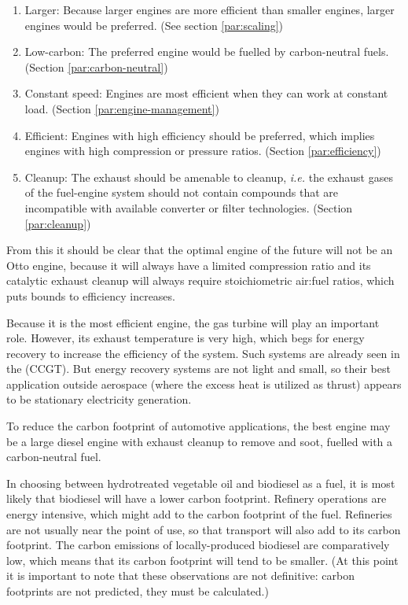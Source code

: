 \begin{enumerate}
  
  \item Larger: Because larger engines are more efficient than smaller engines,
  larger engines would be preferred. (See section \ref{par:scaling})
  
  \item Low-carbon: The preferred engine would be fuelled by carbon-neutral
  fuels. (Section \ref{par:carbon-neutral})
  
  \item Constant speed: Engines are most efficient when they can work at
  constant load. (Section \ref{par:engine-management})
  
  \item Efficient: Engines with high efficiency should be preferred, which
  implies engines with high compression or pressure ratios. (Section
  \ref{par:efficiency})
  
  \item Cleanup: The exhaust should be amenable to cleanup, \textit{i.e.} the
  exhaust gases of the fuel-engine system should not contain compounds that are
  incompatible with available converter or filter technologies. (Section
  \ref{par:cleanup})
     
\end{enumerate} 

From this it should be clear that the optimal engine of the future will not be
an Otto engine, because it will always have a limited compression ratio and its
catalytic exhaust cleanup will always require stoichiometric air:fuel ratios,
which puts bounds to efficiency increases.

Because it is the most efficient engine, the gas turbine will play an important
role. However, its exhaust temperature is very high, which begs for energy
recovery to increase the efficiency of the system. Such systems are already seen
in the  (CCGT). But energy recovery systems
are not light and small, so their best application outside aerospace (where the
excess heat is utilized as thrust) appears to be stationary electricity
generation.

To reduce the carbon footprint of automotive applications, the best engine may
be a large diesel engine with exhaust cleanup to remove \nox and soot, fuelled
with a carbon-neutral fuel.

In choosing between hydrotreated vegetable oil and biodiesel as a fuel, it is
most likely that biodiesel will have a lower carbon footprint. Refinery
operations are energy intensive, which might add to the carbon footprint of the
fuel. Refineries are not usually near the point of use, so that transport will
also add to its carbon footprint. The carbon emissions of locally-produced
biodiesel are comparatively low, which means that its carbon footprint will tend
to be smaller. (At this point it is important to note that these observations
are not definitive: carbon footprints are not predicted, they must be
calculated.)

